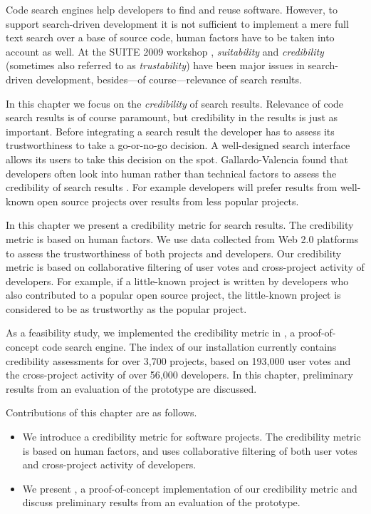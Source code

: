 Code search engines help developers to find and reuse software. However, to support search-driven development it is not sufficient to implement a mere full text search over a base of source code, human factors have to be taken into account as well. At the SUITE 2009 workshop \cite{Kuhn09a}, \emph{suitability} and \emph{credibility} (sometimes also referred to as \emph{trustability}) have been major issues in search-driven development, besides---of course---relevance of search results.  

In this chapter we focus on the \emph{credibility} of search results. Relevance of code search results is of course paramount, but credibility in the results is just as important. Before integrating a search result the developer has to assess its trustworthiness to take a go-or-no-go decision. A well-designed search interface allows its users to take this decision on the spot. Gallardo-Valencia \etal found that developers often look into human rather than technical factors to assess the credibility of search results \cite{Gall09a}. For example developers will prefer results from well-known open source projects over results from less popular projects.

In this chapter we present a credibility metric for search results. The credibility metric is based on human factors. We use data collected from Web 2.0 platforms to assess the trustworthiness of both projects and developers. Our credibility metric is based on collaborative filtering of user votes and cross-project activity of developers. For example, if a little-known project is written by developers who also contributed to a popular open source project, the little-known project is considered to be as trustworthy as the popular project. 

As a feasibility study, we implemented the credibility metric in \Jbd, a proof-of-concept code search engine. The index of our \Jbd installation currently contains credibility assessments for over 3,700 projects, based on 193,000 user votes and the cross-project activity of over 56,000 developers. In this chapter, preliminary results from an evaluation of the prototype are discussed.

Contributions of this chapter are as follows.
\begin{itemize}
\item We introduce a credibility metric for software projects. The credibility metric is based on human factors, and uses collaborative filtering of both user votes and cross-project activity of developers.
\item We present \Jbd, a proof-of-concept implementation of our credibility metric and discuss preliminary results from an evaluation of the prototype.
\end{itemize}

